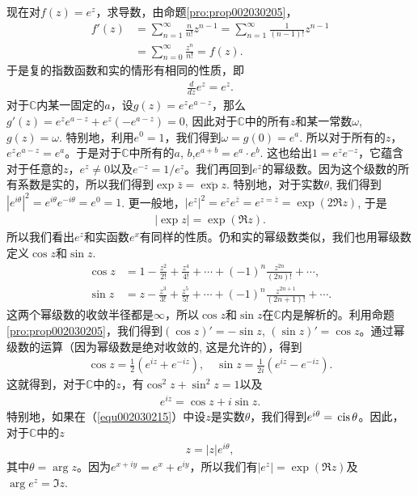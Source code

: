 现在对$f(z)=e^z$，求导数，由命题\ref{pro:prop002030205}，
\[
\begin{aligned}
f'(z) &= \sum_{n=1}^{\infty}{\frac{n}{n!}z^{n-1}} = \sum_{n=1}^{\infty}{\frac{1}{(n-1)!}z^{n-1}}\\
&= \sum_{n=0}^{\infty}{\frac{z^n}{n!}} = f(z).
\end{aligned}
\]
于是复的指数函数和实的情形有相同的性质，即
\begin{gather}\label{equ002030212}
\frac{d}{dz}{e^z} = e^z.
\end{gather}
对于$\mathbb{C}$内某一固定的$a$，设$g(z) = e^ze^{a-z}$，那么$g'(z) = e^ze^{a-z} + e^z(-e^{a-z}) = 0$, 因此对于$\mathbb{C}$中的所有$z$和某一常数$\omega$, $g(z) = \omega$. 特别地，利用$e^0 = 1$，我们得到$\omega = g(0) = e^a$. 所以对于所有的$z$，$e^ze^{a-z}=e^a$。于是对于$\mathbb{C}$中所有的$a$, $b$,$e^{a+b} = e^a \cdot e^b$. 这也给出$1 = e^ze^{-z}$，它蕴含对于任意的$z$，$e^z \neq 0$以及$e^{-z} = 1/e^z$。我们再回到$e^z$的幂级数。因为这个级数的所有系数是实的，所以我们得到$\exp{\bar{z}} = \overline{\exp{z}}$. 特别地，对于实数$\theta$, 我们得到$|e^{i\theta}|^2 = e^{i\theta}e^{-i\theta} = e^0 = 1$. 更一般地，$|e^z|^2 = e^ze^{\bar{z}} = e^{z = \bar{z}} = \exp{(2\Re{z})}$, 于是 
\begin{gather}\label{equ002030213}
|\exp{z}| = \exp{(\Re{z})}.
\end{gather}
所以我们看出$e^z$和实函数$e^x$有同样的性质。仍和实的幂级数类似，我们也用幂级数定义$\cos{z}$和$\sin{z}$. 
\[
\begin{aligned}
\cos{z} &= 1 - \frac{z^2}{2!} + \frac{z^4}{4!} + \cdots + (-1)^n\frac{z^{2n}}{(2n)!} + \cdots,\\
\sin{z} &= z - \frac{z^3}{3!} + \frac{z^5}{5!} + \cdots + (-1)^n\frac{z^{2n+1}}{(2n+1)!} + \cdots.
\end{aligned}
\]
这两个幂级数的收敛半径都是$\infty$，所以$\cos{z}$和$\sin{z}$在$\mathbb{C}$内是解析的。利用命题\ref{pro:prop002030205}，我们得到$(\cos{z})' = -\sin{z}$, $(\sin{z})' = \cos{z}$。通过幂级数的运算（因为幂级数是绝对收敛的, 这是允许的），得到
\begin{gather}\label{equ002030214}
\cos{z} = \frac{1}{2}(e^{iz} + e^{-iz}), \quad \sin{z} = \frac{1}{2i}(e^{iz} - e^{-iz}).
\end{gather}
这就得到，对于$\mathbb{C}$中的$z$，有$\cos^2{z} + \sin^2{z} = 1$以及
\begin{gather}\label{equ002030215}
e^{iz} = \cos{z} + i\sin{z}.
\end{gather}
特别地，如果在（\ref{equ002030215}）中设$z$是实数$\theta$，我们得到$e^{i\theta} = \,\text{cis}\,{\theta}$。因此，对于$\mathbb{C}$中的$z$
\begin{gather}\label{equ002030216}
z = |z|e^{i\theta},
\end{gather}
其中$\theta = \arg{z}$。因为$e^{x+iy} = e^x+e^{iy}$，所以我们有$|e^z| = \exp{(\Re{z})}$及$\arg{e^z} = \Im{z}$.

